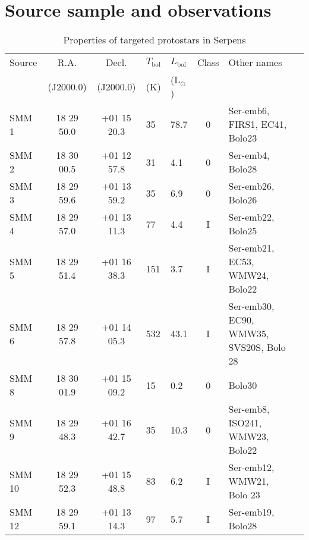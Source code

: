 \documentclass{aa}
\begin{document}
\section{Source sample and observations}
\label{section:observations}
\begin{table*} 
\caption{Properties of targeted protostars in Serpens} %
\label{table:2} %
\centering %
\begin{tabular}{l c c l l c l l} \hline\hline 
Source & R.A. & Decl. & $T_\mathrm{bol}$ & $L_\mathrm{bol}$ & Class & Other names\\ 
& (J2000.0) & (J2000.0) & (K) & (L$_\odot$) & &\\ 
\hline
SMM 1 & 18 29 50.0 & +01 15 20.3 & 35 & 78.7 & 0 & Ser-emb6, FIRS1, EC41, Bolo23\\
SMM 2 & 18 30 00.5 & +01 12 57.8 & 31 & 4.1 & 0 & Ser-emb4, Bolo28\\
SMM 3 & 18 29 59.6 & +01 13 59.2 & 35 & 6.9 & 0 & Ser-emb26, Bolo26\\
SMM 4 & 18 29 57.0 & +01 13 11.3 & 77 & 4.4 & I & Ser-emb22, Bolo25\\
SMM 5 & 18 29 51.4 & +01 16 38.3 & 151 & 3.7 & I & Ser-emb21, EC53, WMW24, Bolo22 \\
SMM 6 & 18 29 57.8 & +01 14 05.3 & 532 & 43.1 & I & Ser-emb30, EC90, WMW35, SVS20S, Bolo
28 \\
SMM 8 & 18 30 01.9 & +01 15 09.2 & 15 & 0.2 & 0 & Bolo30\\ 
SMM 9 & 18 29 48.3 & +01 16 42.7 & 35 & 10.3 & 0 & Ser-emb8, ISO241, WMW23, Bolo22\\
SMM 10 & 18 29 52.3 & +01 15 48.8 & 83 & 6.2 & I & Ser-emb12, WMW21, Bolo 23\\
SMM 12 & 18 29 59.1 & +01 13 14.3 & 97 & 5.7 & I & Ser-emb19, Bolo28\\
\hline 
\end{tabular}
\end{table*}
\end{document}
